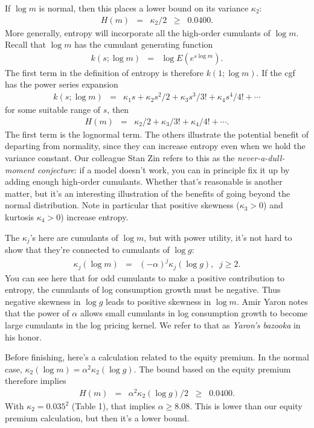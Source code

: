 \documentclass[11pt]{article}
\begin{document}
If $\log m $ is normal, then this places a lower bound on its variance $\kappa_2$:
\begin{eqnarray*}
    H(m) &=& \kappa_2/2 \;\;\geq\;\; 0.0400 .
\end{eqnarray*}
More generally, entropy will incorporate all the high-order cumulants of $\log m$.
Recall that $\log m$ has the cumulant generating function
\begin{eqnarray*}
    k(s; \log m) &=& \log E \left( e^{s \log m} \right) .
\end{eqnarray*}
The first term in the definition of entropy is therefore $k(1; \log m)$.
If the cgf has the power series expansion
\begin{eqnarray*}
    k(s; \log m) &=& \kappa_1 s + \kappa_2 s^2/2 + \kappa_3 s^3 / 3! + \kappa_4 s^4/ 4! + \cdots
\end{eqnarray*}
for some suitable range of $s$,
then
\begin{eqnarray*}
    H(m)  &=& \kappa_2 /2 + \kappa_3 / 3! + \kappa_4 / 4! + \cdots .
\end{eqnarray*}
The first term is the lognormal term.
The others illustrate the potential benefit of departing from normality,
since they can increase entropy even when we hold the variance constant.
Our colleague Stan Zin refers to this as the {\it never-a-dull-moment conjecture\/}:
if a model doesn't work, you can in principle fix it up by adding enough
high-order cumulants.
Whether that's reasonable is another matter, but it's an interesting
illustration of the benefits of going beyond the normal distribution.
Note in particular that positive skewness ($\kappa_3 > 0$) and kurtosis $\kappa_4 > 0$)
increase entropy.


The $\kappa_j$'s here are cumulants of $\log m$,
but with power utility, it's not hard to show that they're connected to cumulants
of $\log g$:
\begin{eqnarray*}
    \kappa_j (\log m) &=& (-\alpha)^j  \kappa_j (\log g), \;\;  j\geq 2.
\end{eqnarray*}
You can see here that for odd cumulants to make a positive contribution to entropy,
the cumulants of log consumption growth must be negative.
Thus negative skewness in $\log g$ leads to positive skewness in $\log m$.
Amir Yaron notes that the power of $\alpha$ allows small cumulants in log consumption growth
to become large cumulants in the log pricing kernel.
We refer to that as {\it Yaron's bazooka\/} in his honor.

Before finishing, here's a calculation related to the equity premium.
In the normal case,
$\kappa_2(\log m) = \alpha^2 \kappa_2(\log g)$.
The bound based on the equity premium therefore implies
\begin{eqnarray*}
    H(m) &=& \alpha^2 \kappa_2(\log g)/2 \;\;\geq\;\; 0.0400 .
\end{eqnarray*}
With $\kappa_2 = 0.035^2 $ (Table 1),
that implies $\alpha \geq 8.08$.
This is lower than our equity premium calculation,
but then it's a lower bound.
\end{document}
